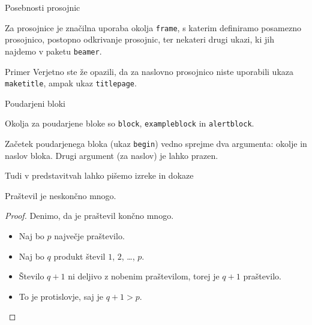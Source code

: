 \begin{frame}{Posebnosti prosojnic}

	Za prosojnice je značilna uporaba okolja \texttt{frame},
	s katerim definiramo posamezno prosojnico,
	postopno odkrivanje prosojnic,
	ter nekateri drugi ukazi, ki jih najdemo v paketu \texttt{beamer}.
	\begin{exampleblock}{Primer}
		Verjetno ste že opazili, da za naslovno prosojnico niste uporabili
		ukaza \texttt{maketitle}, ampak ukaz \texttt{titlepage}.
	\end{exampleblock}
\end{frame}

\begin{frame}{Poudarjeni bloki}

		Okolja za poudarjene bloke so \texttt{block}, \texttt{exampleblock} in \texttt{alertblock}.

		Začetek poudarjenega bloka (ukaz \texttt{begin}) vedno sprejme 
		dva argumenta: okolje in naslov bloka.
		Drugi argument (za naslov) je lahko prazen. 

\end{frame}

\begin{frame}{Tudi v predstavitvah lahko pišemo izreke in dokaze}

	\begin{izrek}
	   Praštevil je neskončno mnogo.
	\end{izrek}
	\begin{proof}
	   Denimo, da je praštevil končno mnogo.
	   \begin{itemize}[<+->]
		  \item Naj bo \(p\) \alert<4>{največje} praštevilo.
		  \item Naj bo \(q\) produkt števil \(1\), \(2\), \ldots, \(p\).
		  \item Število \(q+1\) ni deljivo z nobenim praštevilom, torej je \(q+1\) praštevilo.
		  \item To je protislovje, saj je \(q+1>p\). \qedhere
	   \end{itemize}
	\end{proof}
 \end{frame}
 
